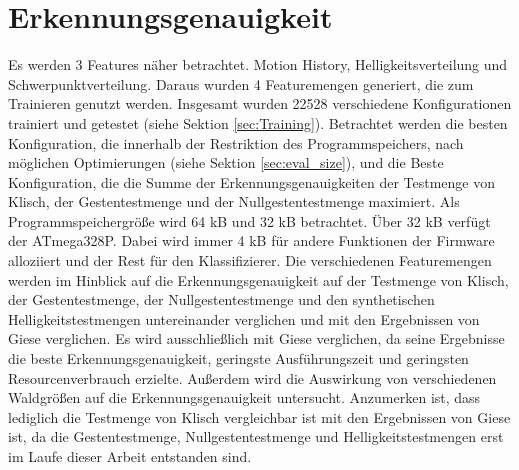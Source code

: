 \section{Erkennungsgenauigkeit}
Es werden 3 Features näher betrachtet. Motion History, Helligkeitsverteilung und Schwerpunktverteilung. Daraus wurden 4 Featuremengen generiert, die zum Trainieren genutzt werden. Insgesamt wurden 22528
verschiedene Konfigurationen trainiert und getestet (siehe Sektion \ref{sec:Training}).
\newline
\newline
Betrachtet werden die besten Konfiguration, die innerhalb der Restriktion des Programmspeichers, nach möglichen Optimierungen (siehe Sektion \ref{sec:eval_size}), und die Beste Konfiguration, die die Summe der
Erkennungsgenauigkeiten der Testmenge von Klisch, der Gestentestmenge und der Nullgestentestmenge maximiert. Als Programmspeichergröße wird 64 kB und 32 kB betrachtet. Über 32 kB verfügt der ATmega328P. Dabei wird
immer 4 kB für andere Funktionen der Firmware alloziiert und der Rest für den Klassifizierer.
\newline
\newline
Die verschiedenen Featuremengen werden im Hinblick auf die Erkennungsgenauigkeit auf der Testmenge von Klisch, der Gestentestmenge, der Nullgestentestmenge und den synthetischen
Helligkeitstestmengen untereinander verglichen und mit den Ergebnissen von Giese verglichen. Es wird ausschließlich mit Giese verglichen, da seine Ergebnisse die beste Erkennungsgenauigkeit, geringste Ausführungszeit und
geringsten Resourcenverbrauch erzielte. Außerdem wird die Auswirkung von verschiedenen Waldgrößen auf die Erkennungsgenauigkeit untersucht. Anzumerken ist, dass lediglich die Testmenge von Klisch vergleichbar ist mit
den Ergebnissen von Giese ist, da die Gestentestmenge, Nullgestentestmenge und Helligkeitstestmengen erst im Laufe dieser Arbeit entstanden sind.







